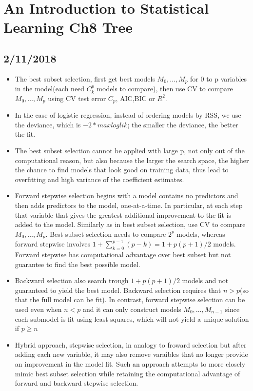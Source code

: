 \documentclass[a4paper, 12pt]{article}
\begin{document}
	
\section*{An Introduction to Statistical Learning Ch8 Tree}
\subsection{2/11/2018}
\begin{itemize}
	\item The best subset selection, first get best models $M_0,\ldots,M_p$ for 0 to p variables in the model(each need $C_k^p$ models to compare), then use CV to compare $M_0,\ldots,M_p$ using CV test error $C_p$, AIC,BIC or $R^2$.
	\item In the case of logistic regression, instead of ordering models by RSS, we use the deviance, which is $-2*maxloglik$; the smaller the deviance, the better the fit. 
	\item The best subset selection cannot be applied with large p, not only out of the computational reason, but also because the larger the search space, the higher the chance to find models that look good on training data, thus lead to overfitting and high variance of the coefficient estimates.
	\item Forward stepwise selection begins with a model contains no predictors and then adds predictors to the model, one-at-a-time. In particular, at each step that variable that gives the greatest additional improvement to the fit is added to the model. Similarly as in best subset selection, use CV to compare $M_0,\ldots,M_p$. Best subset selection needs to compare $2^p$ models, whereas forward stepwise involves $1+\sum_{k=0}^{p-1}(p-k)=1+p(p+1)/2$ models. Forward stepwise has computational advantage over best subset but not guarantee to find the best possible model.
	\item Backward selection also search trough $1+p(p+1)/2$ models and not guaranteed to yield the best model. Backward selection requires that $n > p$(so that the full model can be fit). In contrast, forward stepwise selection can be used even when $n<p$ and it can only construct models $M_0,\ldots,M_{n-1}$ since each submodel is fit using least squares, which will not yield a unique solution if $p\ge n$
	\item Hybrid approach, stepwise selection, in analogy to froward selection but after adding each new variable, it may also remove varaibles that no longer provide an improvement in the model fit. Such an approach attempts to more closely mimic best subset selection while retaining the computational advantage of forward and backward stepwise selection.

\end{itemize}
\end{document}
